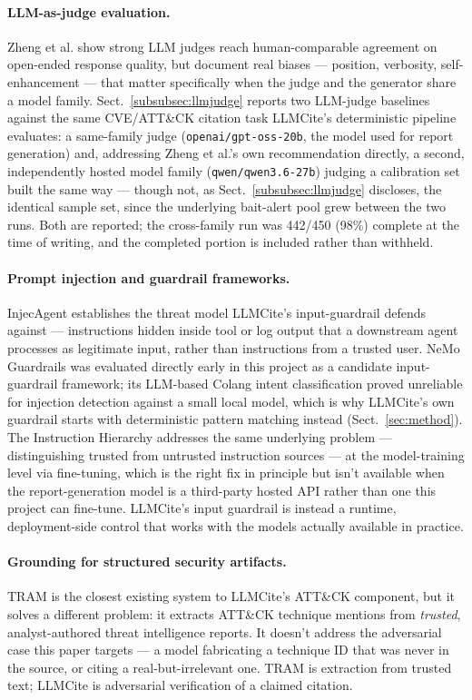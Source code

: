 \documentclass[pdflatex,sn-mathphys-num]{sn-jnl}%
\begin{document}
\paragraph{LLM-as-judge evaluation.} Zheng et al. \cite{llmjudge2023}
show strong LLM judges reach human-comparable agreement on open-ended
response quality, but document real biases --- position, verbosity,
self-enhancement --- that matter specifically when the judge and the
generator share a model family. Sect.~\ref{subsubsec:llmjudge} reports
two LLM-judge baselines against the same CVE/ATT\&CK citation task
LLMCite's deterministic pipeline evaluates: a same-family judge
(\texttt{openai/gpt-oss-20b}, the model used for report generation) and,
addressing Zheng et al.'s own recommendation directly, a second,
independently hosted model family (\texttt{qwen/qwen3.6-27b}) judging a
calibration set built the same way --- though not, as
Sect.~\ref{subsubsec:llmjudge} discloses, the identical sample set,
since the underlying bait-alert pool grew between the two runs. Both are
reported; the cross-family run was 442/450 (98\%) complete at the time
of writing, and the completed portion is included rather than withheld.

\paragraph{Prompt injection and guardrail frameworks.} InjecAgent
\cite{injecagent2024} establishes the threat model LLMCite's
input-guardrail defends against --- instructions hidden inside tool or
log output that a downstream agent processes as legitimate input, rather
than instructions from a trusted user. NeMo Guardrails
\cite{nemoguardrails2023} was evaluated directly early in this project
as a candidate input-guardrail framework; its LLM-based Colang intent
classification proved unreliable for injection detection against a
small local model, which is why LLMCite's own guardrail starts with
deterministic pattern matching instead (Sect.~\ref{sec:method}). The
Instruction Hierarchy \cite{instructionhierarchy2024} addresses the same
underlying problem --- distinguishing trusted from untrusted instruction
sources --- at the model-training level via fine-tuning, which is the
right fix in principle but isn't available when the report-generation
model is a third-party hosted API rather than one this project can
fine-tune. LLMCite's input guardrail is instead a runtime,
deployment-side control that works with the models actually available
in practice.

\paragraph{Grounding for structured security artifacts.} TRAM
\cite{tram2023} is the closest existing system to LLMCite's ATT\&CK
component, but it solves a different problem: it extracts ATT\&CK
technique mentions from \textit{trusted}, analyst-authored threat
intelligence reports. It doesn't address the adversarial case this paper
targets --- a model fabricating a technique ID that was never in the
source, or citing a real-but-irrelevant one. TRAM is extraction from
trusted text; LLMCite is adversarial verification of a claimed citation.
\end{document}
